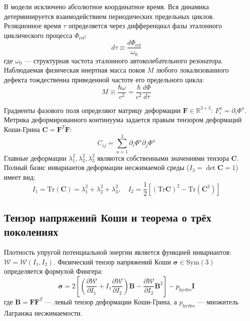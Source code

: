 \documentclass[12pt,a4paper]{article}
\begin{document}
	В модели исключено абсолютное координатное время. Вся динамика детерминируется взаимодействием периодических предельных циклов. Реляционное время $\tau$ определяется через дифференциал фазы эталонного циклического процесса $\Phi_{\text{ref}}$:
	\begin{equation}
		d\tau \equiv \frac{d\Phi_{\text{ref}}}{\omega_0}
	\end{equation}
	где $\omega_0$ — структурная частота эталонного автоколебательного резонатора. Наблюдаемая физическая инертная масса покоя $M$ любого локализованного дефекта тождественна приведенной частоте его предельного цикла:
	\begin{equation}
		M \equiv \frac{\hbar \omega}{c^2} = \frac{\hbar}{c^2} \frac{d\Phi}{d\tau}
	\end{equation}
	
	Градиенты фазового поля определяют матрицу деформации $\mathbf{F} \in \mathbb{R}^{3 \times 3}$: $F_i^a = \partial_i \Phi^a$. Метрика деформированного континуума задается правым тензором деформаций Коши-Грина $\mathbf{C} = \mathbf{F}^T \mathbf{F}$:
	\begin{equation}
		C_{ij} = \sum_{a=1}^3 \partial_i \Phi^a \partial_j \Phi^a
	\end{equation}
	Главные деформации $\lambda_1^2, \lambda_2^2, \lambda_3^2$ являются собственными значениями тензора $\mathbf{C}$. Полный базис инвариантов деформации несжимаемой среды ($I_3 = \det\mathbf{C} = 1$) имеет вид:
	\begin{equation}
		I_1 = \text{Tr}(\mathbf{C}) = \lambda_1^2 + \lambda_2^2 + \lambda_3^2, \quad I_2 = \frac{1}{2} \left[ (\text{Tr}\mathbf{C})^2 - \text{Tr}(\mathbf{C}^2) \right]
	\end{equation}
	
	\subsection{Тензор напряжений Коши и теорема о трёх поколениях}
	Плотность упругой потенциальной энергии является функцией инвариантов: $\mathcal{W} = \mathcal{W}(I_1, I_2)$. Физический тензор напряжений Коши $\boldsymbol{\sigma} \in \mathrm{Sym}(3)$ определяется формулой Фингера:
	\begin{equation}
		\boldsymbol{\sigma} = 2 \left[ \left( \frac{\partial \mathcal{W}}{\partial I_1} + I_1 \frac{\partial \mathcal{W}}{\partial I_2} \right) \mathbf{B} - \frac{\partial \mathcal{W}}{\partial I_2} \mathbf{B}^2 \right] - p_{\text{hydro}} \mathbf{I}
	\end{equation}
	где $\mathbf{B} = \mathbf{F} \mathbf{F}^T$ — левый тензор деформации Коши-Грина, а $p_{\text{hydro}}$ — множитель Лагранжа несжимаемости.
	
\end{document}
